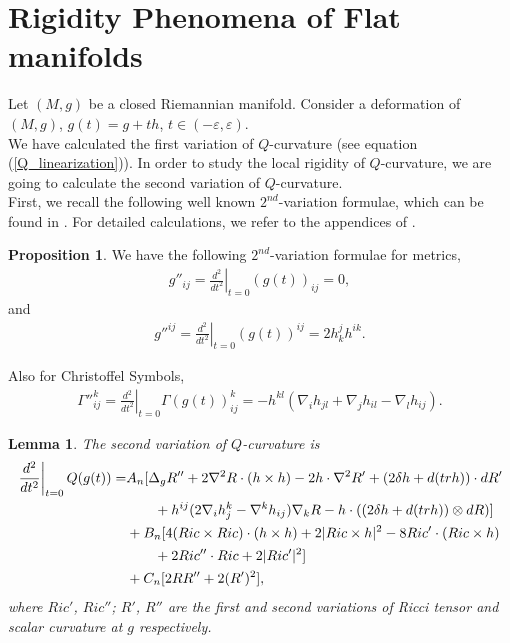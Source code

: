\documentclass[12pt]{amsart}
\newtheorem{lemma}[theorem]{Lemma}
\theoremstyle{definition}
\newtheorem{proposition}[theorem]{Proposition}
\theoremstyle{remark}
\numberwithin{equation}{section}
\begin{document}
\section{Rigidity Phenomena of Flat manifolds}

Let $(M,g)$ be a closed Riemannian manifold. Consider a deformation of $(M,g)$, $g(t)=g+th$, $t \in (-\varepsilon, \varepsilon)$.\\

We have calculated the first variation of $Q$-curvature (see equation (\ref{Q_linearization})). In order to study the local rigidity of $Q$-curvature, we are going to calculate the second variation of $Q$-curvature.\\

First, we recall the following well known $2^{nd}$-variation formulae, which can be found in \cite{F-M}. For detailed calculations, we refer to the appendices of \cite{Yuan}.

\begin{proposition}
We have the following $2^{nd}$-variation formulae for metrics,
\begin{align}
g''_{ij} = \left.\frac{d^2}{dt^2}\right|_{t=0} (g(t))_{ij} = 0,
\end{align}
and
\begin{align}
g''^{ij} = \left.\frac{d^2}{dt^2}\right|_{t=0} (g(t))^{ij} = 2 h_k^j h^{ik}.
\end{align}

Also for Christoffel Symbols,
\begin{align}
{\Gamma''}_{ij}^k = \left.\frac{d^2}{dt^2}\right|_{t=0} \Gamma(g(t))^k_{ij} = - h^{kl} \left( \nabla_i  h_{jl} + \nabla_j h_{il}
- \nabla_l h_{ij} \right).
\end{align}
\end{proposition}

\begin{lemma}
The second variation of $Q$-curvature is
\begin{align}
\left.\frac{d^2}{dt^2}\right|_{t=0} Q(g(t)) =& A_n [ \Delta_g R'' + 2 \nabla^2 R \cdot ( h \times h ) - 2 h \cdot \nabla^2 R' + ( 2 \delta h + d (tr h) ) \cdot dR' \\ \notag &\ \ \ \ \ \ +  h^{ij} ( 2 \nabla_i h_j^k - \nabla^k h_{ij} ) \nabla_k R - h \cdot ((2 \delta h + d(tr h))  \otimes d R )  ]\\ \notag
& + B_n [ 4 (Ric \times Ric) \cdot ( h \times h ) + 2 | Ric \times h |^2 - 8 Ric' \cdot ( Ric \times h )\\ \notag &\ \ \ \ \ \ + 2 Ric''\cdot Ric + 2 | Ric' |^2  ]\\ \notag
& + C_n [ 2 R R'' + 2(R')^2], \notag
\end{align}
where $Ric'$, $Ric''$; $R'$, $R''$ are the first and second variations of Ricci tensor and scalar curvature at $g$ respectively.
\end{lemma}
\end{document}
